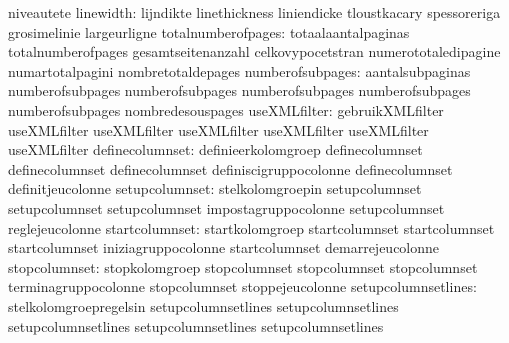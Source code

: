                                   niveautete
                       linewidth: lijndikte                        linethickness
                                  liniendicke                      tloustkacary
                                  spessoreriga                     grosimelinie
                                  largeurligne
              totalnumberofpages: totaalaantalpaginas              totalnumberofpages
                                  gesamtseitenanzahl               celkovypocetstran
                                  numerototaledipagine             numartotalpagini
                                  nombretotaldepages
                numberofsubpages: aantalsubpaginas                 numberofsubpages
                                  numberofsubpages                 numberofsubpages
                                  numberofsubpages                 numberofsubpages
                                  nombredesouspages
                    useXMLfilter: gebruikXMLfilter                 useXMLfilter
                                  useXMLfilter                     useXMLfilter
                                  useXMLfilter                     useXMLfilter
                                  useXMLfilter
                 definecolumnset: definieerkolomgroep              definecolumnset
                                  definecolumnset                  definecolumnset
                                  definiscigruppocolonne           definecolumnset
                                  definitjeucolonne
                  setupcolumnset: stelkolomgroepin                 setupcolumnset
                                  setupcolumnset                   setupcolumnset
                                  impostagruppocolonne             setupcolumnset
                                  reglejeucolonne
                  startcolumnset: startkolomgroep                  startcolumnset
                                  startcolumnset                   startcolumnset
                                  iniziagruppocolonne              startcolumnset
                                  demarrejeucolonne
                   stopcolumnset: stopkolomgroep                   stopcolumnset
                                  stopcolumnset                    stopcolumnset
                                  terminagruppocolonne             stopcolumnset
                                  stoppejeucolonne
             setupcolumnsetlines: stelkolomgroepregelsin           setupcolumnsetlines
                                  setupcolumnsetlines              setupcolumnsetlines
                                  setupcolumnsetlines              setupcolumnsetlines
